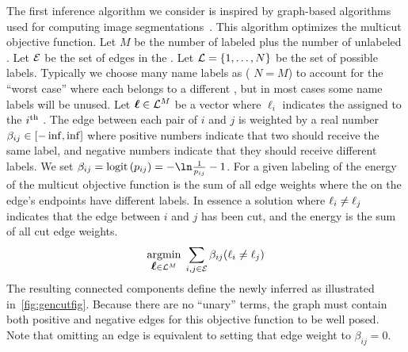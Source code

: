             \newcommand{\nAnnots}{M}
            \newcommand{\nNames}{N}
            The first inference algorithm we consider is inspired by
              graph-based algorithms used for computing image
              segmentations~\cite{kappes_globally_2011,
              kappes_higherorder_2016}.
            This algorithm optimizes the multicut objective function.
            Let $\nAnnots$ be the number of labeled plus the number of
              unlabeled \annots{}.
            Let $\mathcal{E}$ be the set of edges in the \idengraph{}.
            Let $\L = \curly{1, \ldots, \nNames}$ be the set of possible
              \name{} labels.
            Typically we choose many name labels as \annots{} (\ie{} $N=M$) to
              account for the ``worst case'' where each \annot{} belongs to a
              different \name{}, but in most cases some name labels will be
              unused.
            Let $\ellv \in \L^{\nAnnots}$ be a vector where $\ell_i$ indicates
              the \name{} assigned to the $i^{\textrm{th}}$ \annot{}.
            The edge between each pair of \annots{} $i$ and $j$ is weighted by
              a real number $\beta_{ij} \in [-\inf, \inf]$ where
              positive numbers indicate that two \annots{} should receive the
              same \name{} label, and negative numbers indicate that they should
              receive different labels.
            We set $\beta_{ij} = \logit{p_{ij}} = \logitI{p_{ij}}$.
            For a given labeling of \annots{} the energy of the multicut
              objective function is the sum of all edge weights where the
              \annots{} on the edge's endpoints have different labels.
            In essence a solution where $\ell_{i} \neq \ell_{j}$
              indicates that the edge between \annots{} $i$ and $j$ has been
              cut, and the energy is the sum of all cut edge weights.
            \begin{equation}\label{eqn:cutobjective}
                \underset{\mbox{\boldmath\ensuremath{\ell}} \in \mathcal{L}^{M}}{\operatorname{argmin}}\;
                \sum_{i,j \in \mathcal{E}}
                    \beta_{ij} (\ell_{i} \neq \ell_{j})
            \end{equation}
            The resulting connected components define the newly inferred
              \names{} as illustrated in~\cref{fig:gencutfig}.
            Because there are no ``unary'' terms, the graph must contain both
              positive and negative edges for this objective function to be well
              posed.
            Note that omitting an edge is equivalent to setting that edge
              weight to $\beta_{ij}=0$.

